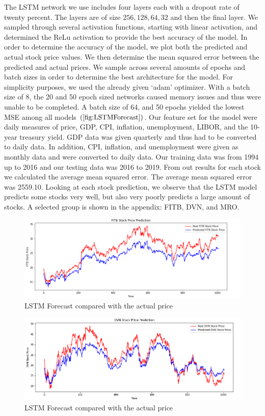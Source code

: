 \documentclass{article}
\begin{document}
The LSTM network we use includes four layers each with a dropout rate of twenty percent. The layers are of size $256,128,64,32$ and then the final layer. We sampled through several activation functions, starting with linear activation, and determined the ReLu activation to provide the best accuracy of the model. In order to determine the accuracy of the model, we plot both the predicted and actual stock price values. We then determine the mean squared error between the predicted and actual prices. We sample across several amounts of epochs and batch sizes in order to determine the best architecture for the model. For simplicity purposes, we used the already given ‘adam’ optimizer. With a batch size of 8, the 20 and 50 epoch sized networks caused memory issues and thus were unable to be completed. A batch size of 64, and 50 epochs yielded the lowest MSE among all models $(\ref{fig:LSTMForecast})$. Our feature set for the model were daily measures of price, GDP, CPI, inflation, unemployment, LIBOR, and the 10-year treasury yield. GDP data was given quarterly and thus had to be converted to daily data. In addition, CPI, inflation, and unemployment were given as monthly data and were converted to daily data. Our training data was from 1994 up to 2016 and our testing data was 2016 to 2019.
From out results for each stock we calculated the average mean squared error. The average mean squared error was 2559.10. Looking at each stock prediction, we observe that the LSTM model predicts some stocks very well, but also very poorly predicts a large amount of stocks. A selected group is shown in the appendix: FITB, DVN, and MRO.
\begin{figure}
    \centering
    \includegraphics[width = 12cm]{Final FITB.png}
    \caption{LSTM Forecast compared with the actual price}
\end{figure}
\begin{figure}
    \centering
    \includegraphics[width = 12cm]{Final DVN.png}
    \caption{LSTM Forecast compared with the actual price}
\end{figure}
\end{document}
